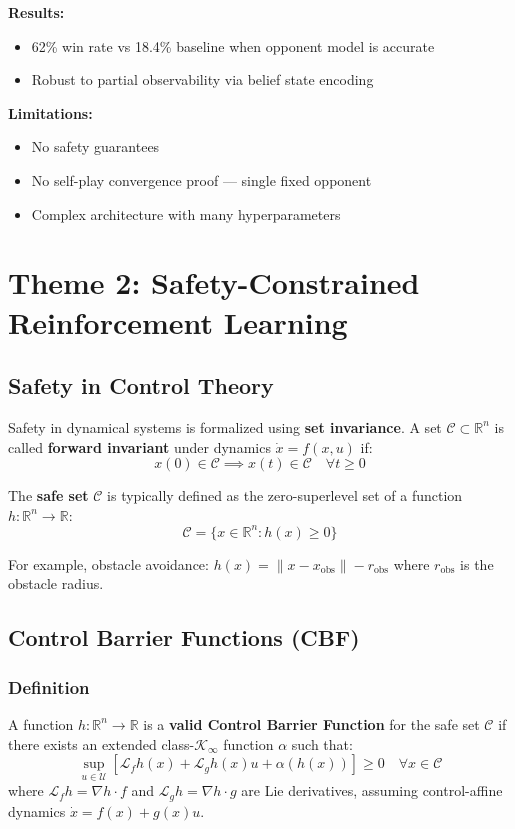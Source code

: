 \documentclass[11pt,a4paper]{report}
\begin{document}
\textbf{Results:}
\begin{itemize}
    \item 62\% win rate vs 18.4\% baseline when opponent model is accurate
    \item Robust to partial observability via belief state encoding
\end{itemize}

\textbf{Limitations:}
\begin{itemize}
    \item No safety guarantees
    \item No self-play convergence proof --- single fixed opponent
    \item Complex architecture with many hyperparameters
\end{itemize}

\section{Theme 2: Safety-Constrained Reinforcement Learning}

\subsection{Safety in Control Theory}

Safety in dynamical systems is formalized using \textbf{set invariance}. A set $\mathcal{C} \subset \mathbb{R}^n$ is called \textbf{forward invariant} under dynamics $\dot{x} = f(x,u)$ if:
\begin{equation}
    x(0) \in \mathcal{C} \implies x(t) \in \mathcal{C} \quad \forall t \geq 0
\end{equation}

The \textbf{safe set} $\mathcal{C}$ is typically defined as the zero-superlevel set of a function $h: \mathbb{R}^n \to \mathbb{R}$:
\begin{equation}
    \mathcal{C} = \{x \in \mathbb{R}^n : h(x) \geq 0\}
\end{equation}

For example, obstacle avoidance: $h(x) = \|x - x_{\text{obs}}\| - r_{\text{obs}}$ where $r_{\text{obs}}$ is the obstacle radius.

\subsection{Control Barrier Functions (CBF)}

\subsubsection{Definition}
A function $h: \mathbb{R}^n \to \mathbb{R}$ is a \textbf{valid Control Barrier Function} for the safe set $\mathcal{C}$ if there exists an extended class-$\mathcal{K}_\infty$ function $\alpha$ such that:
\begin{equation}
    \sup_{u \in \mathcal{U}} \left[ \mathcal{L}_f h(x) + \mathcal{L}_g h(x) u + \alpha(h(x)) \right] \geq 0 \quad \forall x \in \mathcal{C}
\end{equation}
where $\mathcal{L}_f h = \nabla h \cdot f$ and $\mathcal{L}_g h = \nabla h \cdot g$ are Lie derivatives, assuming control-affine dynamics $\dot{x} = f(x) + g(x)u$.
\end{document}
